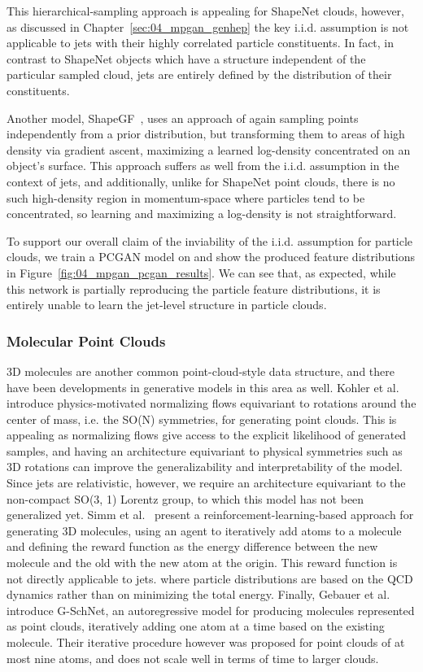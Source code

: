 This hierarchical-sampling approach is appealing for ShapeNet clouds, however, as discussed in Chapter~\ref{sec:04_mpgan_genhep} the key i.i.d. assumption is not applicable to jets with their highly correlated particle constituents.
In fact, in contrast to ShapeNet objects which have a structure independent of the particular sampled cloud, jets are entirely defined by the distribution of their constituents.

Another model, ShapeGF~\cite{ShapeGF}, uses an approach of again sampling points independently from a prior distribution, but transforming them to areas of high density via gradient ascent, maximizing a learned log-density concentrated on an object's surface.
This approach suffers as well from the i.i.d. assumption in the context of jets, and additionally, unlike for ShapeNet point clouds, there is no such high-density region in momentum-space where particles tend to be concentrated, so learning and maximizing a log-density is not straightforward.

To support our overall claim of the inviability of the i.i.d. assumption for particle clouds, we train a PCGAN model on \jetnet and show the produced feature distributions in Figure~\ref{fig:04_mpgan_pcgan_results}. 
We can see that, as expected, while this network is partially reproducing the particle feature distributions, it is entirely unable to learn the jet-level structure in particle clouds.

\subsubsection{Molecular Point Clouds}

3D molecules are another common point-cloud-style data structure, and there have been developments in generative models in this area as well.
Kohler et al.~\cite{kohler20} introduce physics-motivated normalizing flows equivariant to rotations around the center of mass, i.e. the SO(N) symmetries, for generating point clouds. 
This is appealing as normalizing flows give access to the explicit likelihood of generated samples, and having an architecture equivariant to physical symmetries such as 3D rotations can improve the generalizability and interpretability of the model. 
Since jets are relativistic, however, we require an architecture equivariant to the non-compact SO(3, 1) Lorentz group, to which this model has not been generalized yet. 
Simm et al.~\cite{simm21} present a reinforcement-learning-based approach for generating 3D molecules, using an agent to iteratively add atoms to a molecule and defining the reward function as the energy difference between the new molecule and the old with the new atom at the origin.
This reward function is not directly applicable to jets. where particle distributions are based on the QCD dynamics rather than on minimizing the total energy. 
Finally, Gebauer et al.~\cite{gschnet} introduce G-SchNet, an autoregressive model for producing molecules represented as point clouds, iteratively adding one atom at a time based on the existing molecule. 
Their iterative procedure however was proposed for point clouds of at most nine atoms, and does not scale well in terms of time to larger clouds.

